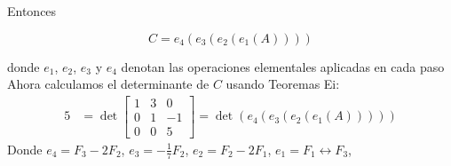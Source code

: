 \documentclass[handout]{beamer} %
\begin{document}
\begin{frame}

Entonces 

$$C=e_4(e_3(e_2(e_1(A))))$$

donde $e_1$, $e_2$, $e_3$ y $e_4$ denotan las operaciones elementales aplicadas en cada paso
Ahora calculamos el determinante de $C$ usando Teoremas Ei:
\pause
\begin{align*}
5&=\det \left[
\begin{array}{rrr}
1&3&0\\
0&1&-1\\
0&0&5
\end{array}
\right]
=\det\left(e_4(e_3(e_2(e_1(A))))\right)
\end{align*}
{Donde $e_4 = F_3-2F_2$, $e_3 = -\frac{1}{7}F_2$, $e_2 = F_2-2F_1$, $e_1 =F_1\leftrightarrow F_3$,}


\end{frame}


\end{document}
